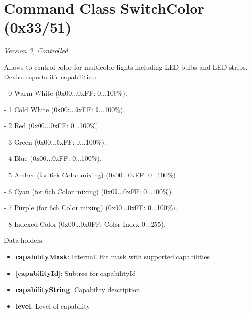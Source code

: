 \section{Command Class SwitchColor (0x33/51)}

\textit{Version 3, Controlled}
\newline

Allows to control color for multicolor lights including LED bulbs and LED strips. Device reports it's capabilities:. 

- 0 Warm White (0x00...0xFF: 0...100\%). 

- 1 Cold White (0x00:...0xFF: 0...100\%). 

- 2 Red (0x00...0xFF: 0...100\%). 

- 3 Green (0x00...0xFF: 0...100\%). 

- 4 Blue (0x00...0xFF: 0...100\%). 

- 5 Amber (for 6ch Color mixing) (0x00...0xFF: 0...100\%). 

- 6 Cyan (for 6ch Color mixing) (0x00...0xFF: 0...100\%). 

- 7 Purple (for 6ch Color mixing) (0x00...0xFF: 0...100\%). 

- 8 Indexed Color (0x00...0x0FF: Color Index 0...255).
\newline

\noindent
Data holders:

\begin{itemize}
\item \textbf{capabilityMask}: Internal. Bit mask with supported capabilities
\item \textbf{[capabilityId]}: Subtree for capabilityId
\item \qquad\textbf{capabilityString}: Capability description
\item \qquad\textbf{level}: Level of capability
\end{itemize}

